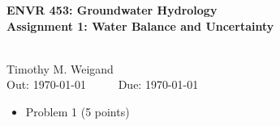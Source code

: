 \documentclass[11pt]{report}
\begin{document}
\begin{center}
\begin{Large}\textbf{ENVR 453: Groundwater Hydrology \\ Assignment 1: Water Balance and Uncertainty} \end{Large}
\\ \vspace{0.1cm} Timothy M. Weigand \vspace{0.1cm}\\ 
Out: \today ~~~~~ Due: \today 
\end{center}

\vspace{0.2cm}


\begin{itemize}
\item Problem 1 (5 points)
\end{itemize}



\end{document}
